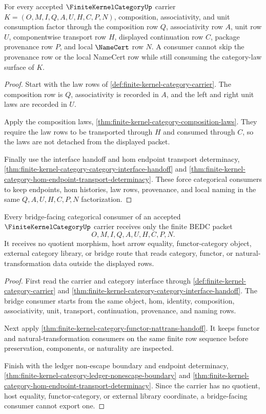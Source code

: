 \begin{theorem}
\label{thm:finite-kernel-category-composition-provenance-factorization}
For every accepted $\FiniteKernelCategoryUp$ carrier $K=(O,M,I,Q,A,U,H,C,P,N)$,
composition, associativity, and unit consumption factor through the composition
row $Q$, associativity row $A$, unit row $U$, componentwise transport row $H$,
displayed continuation row $C$, package provenance row $P$, and local
$\NameCert$ row $N$. A consumer cannot skip the provenance row or the local
NameCert row while still consuming the category-law surface of $K$.
\end{theorem}
\begin{proof}
Start with the law rows of \autoref{def:finite-kernel-category-carrier}. The
composition row is $Q$, associativity is recorded in $A$, and the left and
right unit laws are recorded in $U$.

Apply the composition laws,
\autoref{thm:finite-kernel-category-composition-laws}. They require the law
rows to be transported through $H$ and consumed through $C$, so the laws are
not detached from the displayed packet.

Finally use the interface handoff and hom endpoint transport determinacy,
\autoref{thm:finite-kernel-category-category-interface-handoff} and
\autoref{thm:finite-kernel-category-hom-endpoint-transport-determinacy}. These
force categorical consumers to keep endpoints, hom histories, law rows,
provenance, and local naming in the same $Q,A,U,H,C,P,N$ factorization.
\end{proof}

\begin{theorem}
\label{thm:finite-kernel-category-bridge-consumer-nonescape}
Every bridge-facing categorical consumer of an accepted $\FiniteKernelCategoryUp$
carrier receives only the finite BEDC packet
$$
O,M,I,Q,A,U,H,C,P,N.
$$
It receives no quotient morphism, host arrow equality, functor-category object,
external category library, or bridge route that reads category, functor, or
natural-transformation data outside the displayed rows.
\end{theorem}
\begin{proof}
First read the carrier and category interface through
\autoref{def:finite-kernel-category-carrier} and
\autoref{thm:finite-kernel-category-category-interface-handoff}. The bridge
consumer starts from the same object, hom, identity, composition,
associativity, unit, transport, continuation, provenance, and naming rows.

Next apply \autoref{thm:finite-kernel-category-functor-nattrans-handoff}. It
keeps functor and natural-transformation consumers on the same finite row
sequence before preservation, components, or naturality are inspected.

Finish with the ledger non-escape boundary and endpoint determinacy,
\autoref{thm:finite-kernel-category-ledger-nonescape-boundary} and
\autoref{thm:finite-kernel-category-hom-endpoint-transport-determinacy}. Since
the carrier has no quotient, host equality, functor-category, or external
library coordinate, a bridge-facing consumer cannot export one.
\end{proof}

